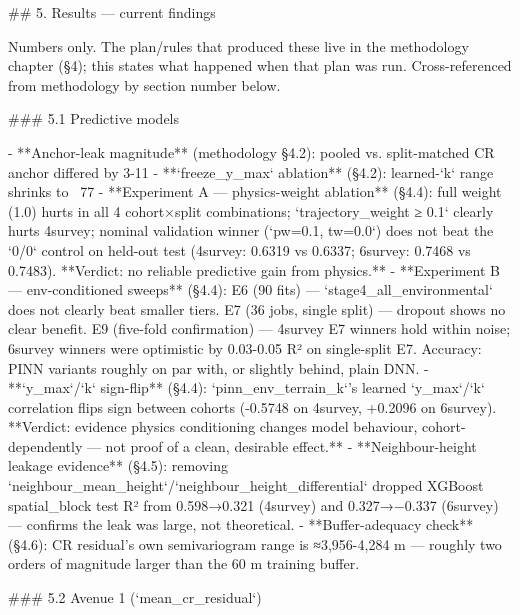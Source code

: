 ## 5. Results — current findings

Numbers only. The plan/rules that produced these live in the methodology chapter (§4); this states what
happened when that plan was run. Cross-referenced from methodology by section number below.

### 5.1 Predictive models

- **Anchor-leak magnitude** (methodology §4.2): pooled vs. split-matched CR anchor differed by 3-11%
- **`freeze_y_max` ablation** (§4.2): learned-`k` range shrinks to ~77%
- **Experiment A — physics-weight ablation** (§4.4): full weight (1.0) hurts in all 4 cohort×split combinations; `trajectory_weight ≥ 0.1` clearly hurts 4survey; nominal validation winner (`pw=0.1, tw=0.0`) does not beat the `0/0` control on held-out test (4survey: 0.6319 vs 0.6337; 6survey: 0.7468 vs 0.7483). **Verdict: no reliable predictive gain from physics.**
- **Experiment B — env-conditioned sweeps** (§4.4): E6 (90 fits) — `stage4_all_environmental` does not clearly beat smaller tiers. E7 (36 jobs, single split) — dropout shows no clear benefit. E9 (five-fold confirmation) — 4survey E7 winners hold within noise; 6survey winners were optimistic by 0.03-0.05 R² on single-split E7. Accuracy: PINN variants roughly on par with, or slightly behind, plain DNN.
- **`y_max`/`k` sign-flip** (§4.4): `pinn_env_terrain_k`'s learned `y_max`/`k` correlation flips sign between cohorts (-0.5748 on 4survey, +0.2096 on 6survey). **Verdict: evidence physics conditioning changes model behaviour, cohort-dependently — not proof of a clean, desirable effect.**
- **Neighbour-height leakage evidence** (§4.5): removing `neighbour_mean_height`/`neighbour_height_differential` dropped XGBoost spatial_block test R² from 0.598→0.321 (4survey) and 0.327→−0.337 (6survey) — confirms the leak was large, not theoretical.
- **Buffer-adequacy check** (§4.6): CR residual's own semivariogram range is ≈3,956-4,284 m — roughly two orders of magnitude larger than the 60 m training buffer.

### 5.2 Avenue 1 (`mean_cr_residual`)

